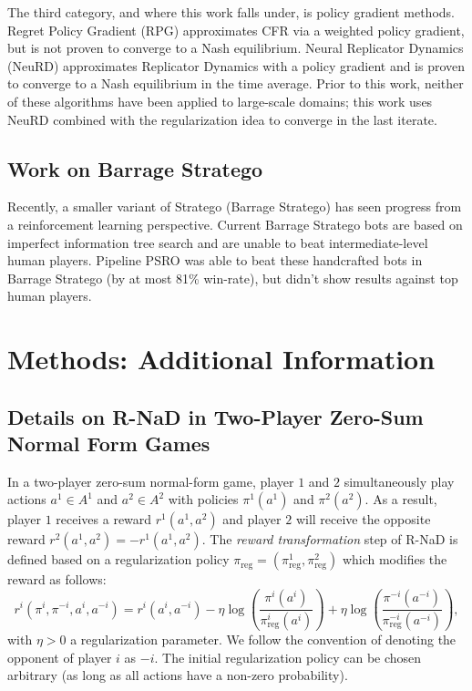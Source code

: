 The third category, and where this work falls under, is policy gradient methods. Regret Policy Gradient (RPG) approximates CFR via a weighted policy gradient, but is not proven to converge to a Nash equilibrium. Neural Replicator Dynamics (NeuRD) approximates Replicator Dynamics with a policy gradient and is proven to converge to a Nash equilibrium in the time average. Prior to this work, neither of these algorithms have been applied to large-scale domains; this work uses NeuRD combined with the regularization idea to converge in the last iterate.

\subsection{Work on Barrage Stratego}
Recently, a smaller variant of Stratego (Barrage Stratego) has seen progress from a reinforcement learning perspective. Current Barrage Stratego bots are based on imperfect information tree search and are unable to beat intermediate-level human players. Pipeline PSRO was able to beat these handcrafted bots in Barrage Stratego (by at most 81\% win-rate), but didn't show results against top human players.

\section{Methods: Additional Information}

\subsection{Details on R-NaD in Two-Player Zero-Sum Normal Form Games}
In a two-player zero-sum normal-form game, player $1$ and $2$ simultaneously play actions $a^1 \in A^1$ and $a^2 \in A^2$ with policies $\pi^1(a^1)$ and $\pi^2(a^2)$. As a result, player $1$ receives a reward $r^1(a^1, a^2)$ and player $2$ will receive the opposite reward $r^2(a^1, a^2) = -r^1(a^1, a^2)$. The \textit{reward transformation} step of R-NaD is defined based on a regularization policy $\pi_{\textrm{reg}} = (\pi^1_{\textrm{reg}}, \pi^2_{\textrm{reg}})$ which modifies the reward as follows:
$$r^i(\pi^i, \pi^{-i},a^i, a^{-i}) = r^i(a^i, a^{-i}) - \eta \log\!\left(\frac{\pi^i(a^i)}{\pi^i_{\textrm{reg}}(a^i)}\right) + \eta \log\!\left(\frac{\pi^{-i}(a^{-i})}{\pi^{-i}_{\textrm{reg}}(a^{-i})}\right),$$
with $\eta > 0$ a regularization parameter. We follow the convention of denoting the opponent of player $i$ as $-i$. The initial regularization policy can be chosen arbitrary (as long as all actions have a non-zero probability).


